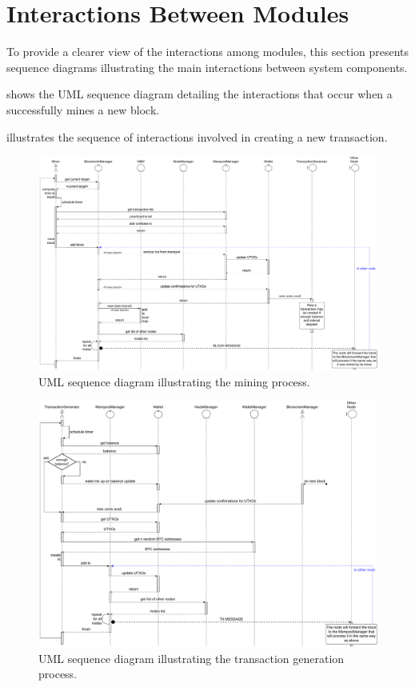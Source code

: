 \section{Interactions Between Modules}\label{sec:interactions}

To provide a clearer view of the interactions among modules, this section
presents sequence diagrams illustrating the main interactions between system
components.

 shows the UML sequence diagram detailing the
interactions that occur when a  successfully mines a new block.

 illustrates the sequence of interactions involved
in creating a new transaction.

\begin{figure}
	\centering
	\includegraphics[width=\textheight,height=0.58\textwidth,keepaspectratio]{img/mining-sequence}
	\caption{UML sequence diagram illustrating the mining
	process.}\label{fig:mining-sequence}
\end{figure}

\begin{figure}
	\centering
	\includegraphics[width=\textheight,height=0.58\textwidth,keepaspectratio]{img/txgen-sequence}
	\caption{UML sequence diagram illustrating the transaction generation
	process.}\label{fig:txgen-sequence}
\end{figure}

